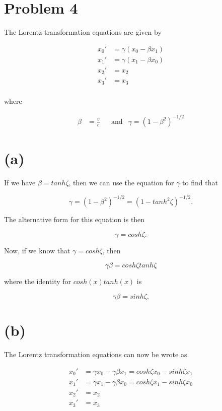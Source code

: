 \documentclass[11pt]{article}
\begin{document}


\clearpage

\section*{Problem 4}

The Lorentz transformation equations are given by

\begin{align*}
    x_{0}' &= \gamma(x_{0} - \beta x_{1}) \\
    x_{1}' &= \gamma(x_{1} - \beta x_{0}) \\
    x_{2}' &= x_{2} \\
    x_{3}' &= x_{3} \\
\end{align*}

where

\begin{align*}
   \beta &= \frac{v}{c} && \text{and} & \gamma = (1 - \beta^{2})^{-1/2}
\end{align*}

\section*{(a)}

If we have $\beta = tanh \zeta$, then we can use the equation for $\gamma$ to find that

$$
\gamma = (1 - \beta^{2})^{-1/2} = (1 - tanh^{2}\zeta)^{-1/2}.
$$

The alternative form for this equation is then

$$
\gamma = cosh \zeta.
$$

Now, if we know that $\gamma = cosh \zeta$, then 

$$
\gamma \beta = cosh \zeta tanh \zeta
$$

where the identity for $cosh(x)tanh(x)$ is

$$
\gamma \beta = sinh \zeta.
$$

\section*{(b)}

The Lorentz transformation equations can now be wrote as

\begin{align*}
    x_{0}' &= \gamma x_{0} - \gamma \beta x_{1} = cosh \zeta x_{0} - sinh \zeta x_{1}\\
    x_{1}' &= \gamma x_{1} - \gamma \beta x_{0} = cosh \zeta x_{1} - sinh \zeta x_{0}\\
    x_{2}' &= x_{2} \\
    x_{3}' &= x_{3} \\
\end{align*}
\end{document}
